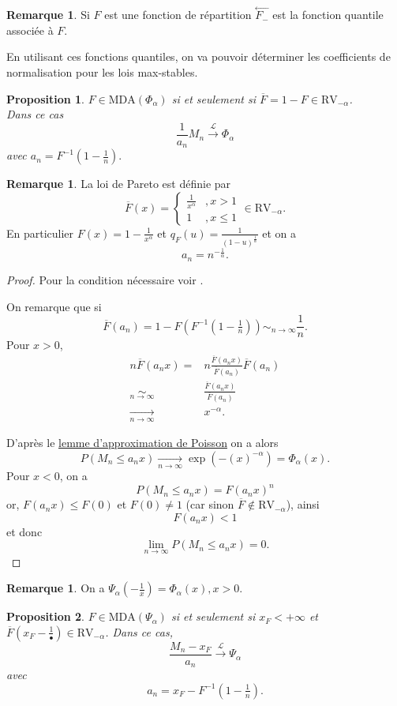 \documentclass[10p,a4paper,reqno,titlepage]{report}
\newcounter{dader}[chapter]
\theoremstyle{plain}
\newtheorem{prop}[prop]{Proposition}
\theoremstyle{definition}
\newtheorem{rem}[dader]{Remarque}
\newcommand{\cvloi}{\stackrel{\mathcal{L}}{\longrightarrow}}
\begin{document}
\begin{rem}
	Si $F$ est une fonction de répartition $ \overset{\leftarrow}{F_- }$ est la fonction quantile associée à $F$.
\end{rem}
En utilisant ces fonctions quantiles, on va pouvoir déterminer les coefficients de normalisation pour les lois max-stables.
\begin{prop}
	$F \in \mathrm{MDA}(\Phi_\alpha)$ si et seulement si $ \overline{F}=1-F \in\mathrm{RV}_{-\alpha}$.\\
	Dans ce cas 
	$$ \frac{1}{a_n} M_n \cvloi \Phi_\alpha$$
	avec $a_n= F^{-1} (1-\tfrac1n ).$
\end{prop}
\begin{rem}
La loi de Pareto est définie par 
$$ \overline{F}(x)= \left\{\begin{array}{ll} \frac{1}{x^\alpha}&, x > 1\\ 1&, x \leq 1 
	\end{array}\right. \in \mathrm{RV}_{-\alpha}.$$
En particulier $F(x)= 1 -\frac{1}{x^\alpha}$ et $q_F (u)= \frac{1}{(1-u)^\tfrac{1}{\alpha}}$ et on a 
$$ a_n = n^{-\tfrac{1}{\alpha}}.$$
\end{rem}
\begin{proof}
	Pour la condition nécessaire voir \cite[pp 55-57]{Resnick_1987} .
	
	On remarque que si 
	$$ \overline{F}(a_n) = 1 - F (F^{-1} (1-\tfrac1n )) \sim_{n\to \infty} \frac{1}{n}.$$
	Pour $x>0$, 
	\begin{align*}
		n \overline{F}(a_n x) = & n \frac{\overline{F}(a_n x )}{\overline{F}(a_n)}\overline{F}(a_n)\\
		\underset{n\to \infty}{\sim} & \frac{\overline{F}(a_n x )}{\overline{F}(a_n)}\\
		\underset{n\to\infty}{\longrightarrow}  & x^{-\alpha}.
	\end{align*}

D'après le \hyperref[lemmepoisson]{lemme d'approximation de Poisson} on a alors 
$$ P(M_n \leq a_n x ) \underset{n\to\infty}{\longrightarrow} \exp(-(x)^{-\alpha}) =\Phi_\alpha(x).$$
Pour $x< 0$, on a 
$$P (M_n \leq a_n x )= F(a_n x)^n$$
or, $F(a_n x ) \leq F(0)$ et $F (0) \neq 1$ (car sinon $\overline{F} \notin \mathrm{RV}_{-\alpha}$), ainsi
$$ F (a_n x ) < 1$$
et donc 
$$ \lim_{n\to\infty} P(M_n \leq a_n x ) = 0.$$
\end{proof}
\begin{rem}
	On a $\Psi_\alpha (-\tfrac1x) = \Phi_\alpha (x), x >0.$
\end{rem}
\begin{prop}
	$F \in \mathrm{MDA}(\Psi_\alpha)$ si et seulement si $x_F < + \infty$ et $\overline{F}(x_F - \frac{1}{\bullet}) \in\mathrm{RV}_{-\alpha}$. Dans ce cas,
	$$ \frac{M_n - x_F}{a_n} \cvloi \Psi_\alpha$$
	avec 
	$$a_n = x_F - F^{-1} (1- \tfrac1n).$$
\end{prop}
\end{document}

